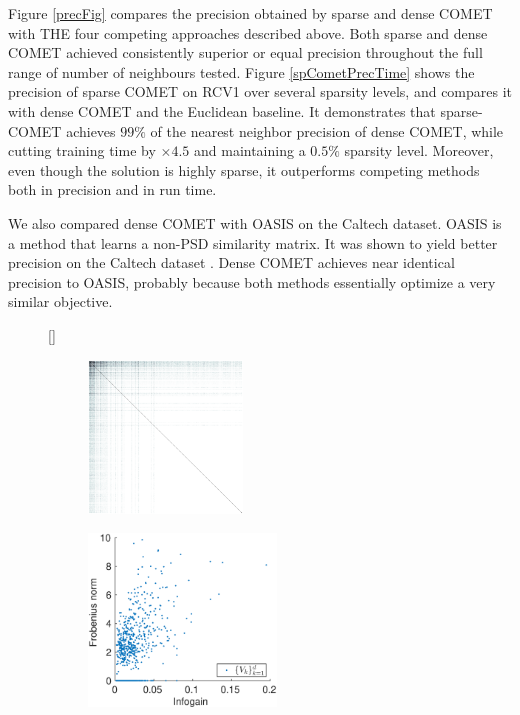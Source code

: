 \documentclass[twoside,11pt]{article}
\newcommand\mat[1]{{#1}}
\newcommand{\W}{\mat{W}}
\begin{document}
Figure \ref{precFig} compares the precision obtained by sparse and dense COMET with THE four competing approaches described above. Both sparse and dense COMET achieved consistently superior or equal precision throughout the full range of number of neighbours tested.
Figure \ref{spCometPrecTime} shows the precision of sparse COMET on RCV1 over several sparsity levels, and compares it with dense COMET and the Euclidean baseline. It demonstrates that sparse-COMET achieves $99\%$ of the nearest neighbor precision of dense COMET, while cutting training time by $\times4.5$ and maintaining a $0.5\%$ sparsity level. Moreover, even though the solution is highly sparse, it outperforms competing methods both in precision and in run time.

We also compared dense COMET with OASIS on the Caltech dataset. OASIS is a method that learns a non-PSD similarity matrix. It was shown to yield better precision on the Caltech dataset \citep{OASIS}. Dense COMET achieves near identical precision to OASIS, probably because both methods essentially optimize a very similar objective.


\begin{figure}[ht]
\captionsetup{font=small}
[\FBwidth]
{\caption{Structured sparsity and extracted features. {\bf (a)} A heat map of the absolute values of the elements of $\W$ trained on RCV1, illustrating the structured sparseness of the learned metric. Features are ordered by their \textit{infogain}.  {\bf (b)} Frob. norm of the groups $V_k$ against the information gain of feature $k$. Sparse COMET successfully assigns zero weights to less-informative features.}\label{fig:spmatrix}}
{
\begin{subfigure}[]
  \centering
  \includegraphics[trim=0 -2.2cm 0 0,width=4.1cm]{sparse_W_visualization}
\end{subfigure}%
\begin{subfigure}[]
  \centering
  \includegraphics[trim=0 0.3cm 0 0,width=5cm]{V_features_vs_infogain}
\end{subfigure}%
\setcounter{subfigure}{0} %
}
\end{figure}
\end{document}
